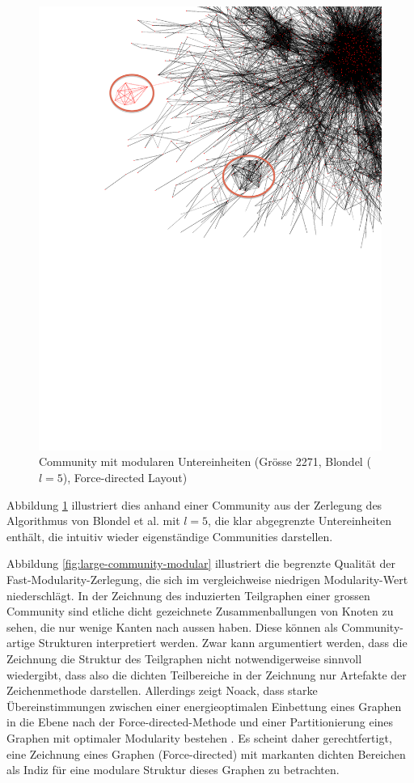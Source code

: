\begin{figure}
  \centering
  \includegraphics[scale=0.7]{images/blondel-l5-com-c3a5eaab680984b123037897b0be74bf-edit.pdf}
  \caption{Community mit modularen Untereinheiten (Gr\"osse 2271,
    Blondel ($l=5$), Force-directed Layout)}
  \label{fig:large-modular}
\end{figure}

Abbildung \ref{fig:large-modular} illustriert dies anhand einer
Community aus der Zerlegung des Algorithmus von Blondel et al. mit
$l=5$, die klar abgegrenzte Untereinheiten enth\"alt, die intuitiv
wieder eigenst\"andige Communities darstellen.


Abbildung \ref{fig:large-community-modular} illustriert die begrenzte
Qualit\"at der Fast-Modularity-Zerlegung, die sich im vergleichweise
niedrigen Modularity-Wert niederschl\"agt. In der Zeichnung des
induzierten Teilgraphen einer grossen Community sind etliche dicht
gezeichnete Zusammenballungen von Knoten zu sehen, die nur wenige
Kanten nach aussen haben. Diese k\"onnen als Community-artige
Strukturen interpretiert werden. Zwar kann argumentiert werden, dass
die Zeichnung die Struktur des Teilgraphen nicht notwendigerweise
sinnvoll wiedergibt, dass also die dichten Teilbereiche in der
Zeichnung nur Artefakte der Zeichenmethode darstellen. Allerdings
zeigt Noack, dass starke \"Ubereinstimmungen zwischen einer
energieoptimalen Einbettung eines Graphen in die Ebene nach der
Force-directed-Methode und einer Partitionierung eines Graphen mit
optimaler Modularity bestehen \cite{Noack2009}. Es scheint daher
gerechtfertigt, eine Zeichnung eines Graphen (Force-directed) mit
markanten dichten Bereichen als Indiz f\"ur eine modulare Struktur
dieses Graphen zu betrachten.


